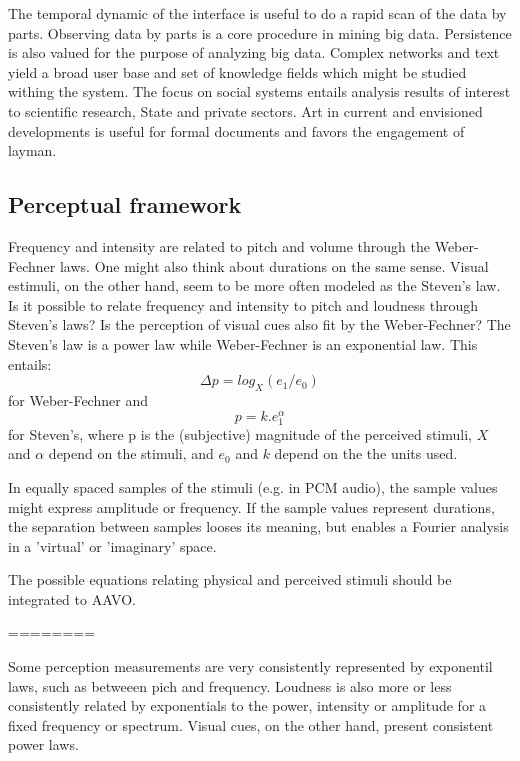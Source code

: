 \documentclass[letterpaper,10pt]{article}
\begin{document}
The temporal dynamic of the interface is useful to do a rapid scan of the data by parts.
Observing data by parts is a core procedure in mining big data.
Persistence is also valued for the purpose of analyzing big data.
Complex networks and text yield a broad user base
and set of knowledge fields which might be studied withing the system.
The focus on social systems entails analysis results of interest
to scientific research, State and private sectors.
Art in current and envisioned developments
is useful for formal documents and favors the engagement
of layman.

\subsection{Perceptual framework}
Frequency and intensity are related to pitch and volume
through the Weber-Fechner laws.
One might also think about durations on the same sense.
Visual estimuli, on the other hand, seem to be 
more often modeled as the Steven's law.
Is it possible to relate frequency and intensity to
pitch and loudness through Steven's laws?
Is the perception of visual cues also fit by the Weber-Fechner?
The Steven's law is a power law while Weber-Fechner is an exponential
law.
This entails:
\begin{equation}
	\Delta p = log_X(e_1/e_0)
\end{equation}
\noindent for Weber-Fechner and
\begin{equation}
	p = k.e_1^\alpha
\end{equation}
\noindent for Steven's,
where p is the (subjective) magnitude of the perceived stimuli,
$X$ and $\alpha$ depend on the stimuli,
and $e_0$ and $k$ depend on the the units used.

In equally spaced samples of the stimuli (e.g. in PCM audio),
the sample values might express amplitude or frequency.
If the sample values represent durations, the separation
between samples looses its meaning, but enables a Fourier
analysis in a 'virtual' or 'imaginary' space.

The possible equations relating physical and perceived stimuli
should be integrated to AAVO.


========


	Some perception measurements are very consistently represented by
	exponentil laws, such as betweeen pich and frequency.
	Loudness is also more or less consistently related by exponentials
	to the power, intensity or amplitude for a fixed frequency or spectrum.
	Visual cues, on the other hand, present consistent power laws.
\end{document}
